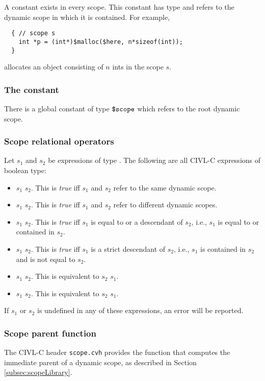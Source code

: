 A constant \chere{} exists in every scope.  This constant has
type \cscope{} and refers to the dynamic scope in which it is
contained.  For example,
\begin{verbatim}
  { // scope s
    int *p = (int*)$malloc($here, n*sizeof(int));
  }
\end{verbatim}
allocates an object consisting of $n$ ints in the scope $s$.

\subsubsection{The constant \cscoperoot{}}

There is a global constant \cscoperoot{} of type $\mbox{\texttt{\${}scope}}$ which
refers to the root dynamic scope.


\subsubsection{Scope relational operators}

Let $s_1$ and $s_2$ be expressions of type \cscope.  The following are
all CIVL-C expressions of boolean type:
\begin{itemize}
\item $s_1$ \ct{==} $s_2$.  This is \emph{true} iff $s_1$ and $s_2$
  refer to the same dynamic scope.
\item  $s_1$ \ct{!=} $s_2$.  This is \emph{true} iff $s_1$ and $s_2$
  refer to different dynamic scopes.
\item  $s_1$ \ct{<=} $s_2$.  This is \emph{true} iff $s_1$ is equal to
  or a descendant of $s_2$, i.e., $s_1$ is equal to or contained in $s_2$.
\item  $s_1$ \ct{<} $s_2$.  This is \emph{true} iff $s_1$ is a strict 
  descendant of $s_2$, i.e., $s_1$ is contained in $s_2$ and is not
  equal to $s_2$.
\item $s_1$ \ct{>} $s_2$.  This is equivalent to $s_2$ \ct{<} $s_1$.
\item  $s_1$ \ct{>=} $s_2$.  This is equivalent to $s_2$ \ct{<=} $s_1$.
\end{itemize}
If $s_1$ or $s_2$ is undefined in any of these expressions, an error
will be reported.

\subsubsection{Scope parent function \texorpdfstring{\cscopeparent}{\$scope\_parent}}

The CIVL-C header \texttt{scope.cvh} provides the function \cscopeparent{} that computes the immediate
parent of a dynamic scope, as described in Section \ref{subsec:scopeLibrary}.


